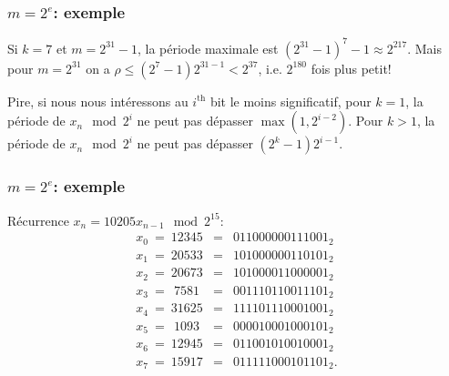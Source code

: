 \documentclass[t,usepdftitle=false]{beamer}
\begin{document}
\begin{frame}
\frametitle{$m=2^e$: exemple}

Si $k=7$ et $m=2^{31}-1$, la période maximale est 
$(2^{31}-1)^7-1 \approx 2^{217}$.
Mais pour $m = 2^{31}$ on a $\rho \le (2^7-1)2^{31-1} < 2^{37}$, 
i.e. $2^{180}$ fois plus petit!

\mbox{}

Pire, si nous nous intéressons au $i^{\mbox{th}}$ bit le moins significatif,
pour $k=1$, la période de $x_n \mod 2^i$ ne peut pas dépasser
$\max (1, 2^{i-2})$.
Pour $k>1$, la période de $x_n \mod 2^i$ ne peut pas dépasser
$(2^k-1)2^{i-1}$.

\end{frame}

\begin{frame}
\frametitle{$m=2^e$: exemple}

Récurrence $x_n = 10205 x_{n-1} \mod 2^{15}$:
\begin {eqnarray*}
  x_0 ~=~ 12345 &=& 011000000111001_2 \\
  x_1 ~=~ 20533 &=& 101000000110101_2 \\
  x_2 ~=~ 20673 &=& 101000011000001_2 \\
  x_3 ~=~ ~7581 &=& 001110110011101_2 \\
  x_4 ~=~ 31625 &=& 111101110001001_2 \\
  x_5 ~=~ ~1093 &=& 000010001000101_2 \\
  x_6 ~=~ 12945 &=& 011001010010001_2 \\
  x_7 ~=~ 15917 &=& 011111000101101_2.\\
\end {eqnarray*}

\end{frame}
\end{document}
